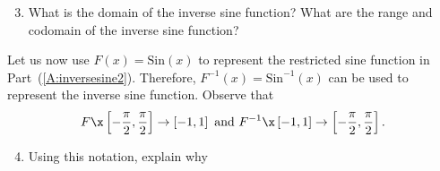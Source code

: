 \begin{enumerate}
\begin{enumerate}
\setcounter{enumii}{2}
\item What is the domain of the inverse sine function?  What are the range and codomain of the inverse sine function?
\end{enumerate}
%
Let us now use  $F ( x ) = \text{Sin} ( x )$ 
\label{sym:restrictsine} to represent the restricted sine function in Part~(\ref{A:inversesine2}).  Therefore, 
$F^{-1} ( x ) = \text{Sin}^{ - 1} ( x ) $
\label{sym:inversesine} can be used to represent the inverse sine function.  Observe that
\[
F\x \left[ -{\frac{{\pi }}{2}, \frac{\pi }{2}} \right] \to \left[ { - 1, 1} \right]
	\text{ and }	
F^{ - 1} \x \left[ { - 1, 1} \right] \to \left[ -{\frac{{\pi }}{2}, \frac{\pi }
{2}} \right].
\]
%
\begin{enumerate}
\setcounter{enumii}{3}
\item Using this notation, explain why
\end{enumerate}
\end{enumerate}

\hbreak
\endinput
